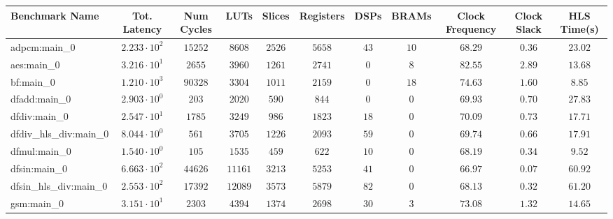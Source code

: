\begin{tabular}{|l|c|c|c|c|c|c|c|c|c|c|}
\hline
Benchmark Name          & Tot. Latency           & Num Cycles & LUTs      & Slices    & Registers & DSPs    & BRAMs   & Clock Frequency & Clock Slack & HLS Time(s) \\
\hline
adpcm:main\_0           & $ 2.233 \cdot 10^{2} $ & $ 15252  $ & $ 8608  $ & $ 2526  $ & $ 5658  $ & $ 43  $ & $ 10  $ & $ 68.29       $ & $ 0.36    $ & $ 23.02   $ \\
aes:main\_0             & $ 3.216 \cdot 10^{1} $ & $ 2655   $ & $ 3960  $ & $ 1261  $ & $ 2741  $ & $ 0   $ & $ 8   $ & $ 82.55       $ & $ 2.89    $ & $ 13.68   $ \\
bf:main\_0              & $ 1.210 \cdot 10^{3} $ & $ 90328  $ & $ 3304  $ & $ 1011  $ & $ 2159  $ & $ 0   $ & $ 18  $ & $ 74.63       $ & $ 1.60    $ & $ 8.85    $ \\
dfadd:main\_0           & $ 2.903 \cdot 10^{0} $ & $ 203    $ & $ 2020  $ & $ 590   $ & $ 844   $ & $ 0   $ & $ 0   $ & $ 69.93       $ & $ 0.70    $ & $ 27.83   $ \\
dfdiv:main\_0           & $ 2.547 \cdot 10^{1} $ & $ 1785   $ & $ 3249  $ & $ 986   $ & $ 1823  $ & $ 18  $ & $ 0   $ & $ 70.09       $ & $ 0.73    $ & $ 17.71   $ \\
dfdiv\_hls\_div:main\_0 & $ 8.044 \cdot 10^{0} $ & $ 561    $ & $ 3705  $ & $ 1226  $ & $ 2093  $ & $ 59  $ & $ 0   $ & $ 69.74       $ & $ 0.66    $ & $ 17.91   $ \\
dfmul:main\_0           & $ 1.540 \cdot 10^{0} $ & $ 105    $ & $ 1535  $ & $ 459   $ & $ 622   $ & $ 10  $ & $ 0   $ & $ 68.19       $ & $ 0.34    $ & $ 9.52    $ \\
dfsin:main\_0           & $ 6.663 \cdot 10^{2} $ & $ 44626  $ & $ 11161 $ & $ 3213  $ & $ 5253  $ & $ 41  $ & $ 0   $ & $ 66.97       $ & $ 0.07    $ & $ 60.92   $ \\
dfsin\_hls\_div:main\_0 & $ 2.553 \cdot 10^{2} $ & $ 17392  $ & $ 12089 $ & $ 3573  $ & $ 5879  $ & $ 82  $ & $ 0   $ & $ 68.13       $ & $ 0.32    $ & $ 61.20   $ \\
gsm:main\_0             & $ 3.151 \cdot 10^{1} $ & $ 2303   $ & $ 4394  $ & $ 1374  $ & $ 2698  $ & $ 30  $ & $ 3   $ & $ 73.08       $ & $ 1.32    $ & $ 14.65   $ \\

\end{tabular}
